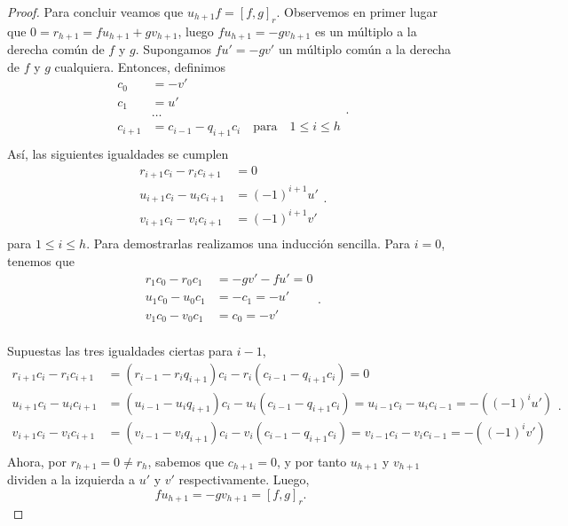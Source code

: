 \begin{proof}
Para concluir veamos que \(u_{h+1}f = [f,g]_r\). Observemos en primer lugar que \(0 = r_{h+1} = fu_{h+1} + gv_{h+1}\), luego \(fu_{h+1} = -gv_{h+1}\) es un múltiplo a la derecha común de \(f\) y \(g\). Supongamos \(fu' = -gv'\) un múltiplo común a la derecha de \(f\) y \(g\) cualquiera. Entonces, definimos
\[
\begin{aligned}
    c_0 &= -v' \\
    c_1 &= u' \\
    &\ldots \\
    c_{i+1} &= c_{i-1} - q_{i+1}c_i\quad \text{para}\quad 1 \le i \le h  \\
\end{aligned}
.\]
Así, las siguientes igualdades se cumplen
\[
\begin{aligned}
    r_{i+1}c_{i} - r_{i}c_{i+1} &= 0 \\
    u_{i+1}c_{i} - u_{i}c_{i+1} &= (-1)^{i+1}u' \\
    v_{i+1}c_{i} - v_{i}c_{i+1} &= (-1)^{i+1}v' \\
\end{aligned}
.\]
para \(1 \le i \le h\). Para demostrarlas realizamos una inducción sencilla. Para \(i = 0\), tenemos que
\[
\begin{aligned}
    r_{1}c_{0} - r_{0}c_{1} &= -gv' - fu' =  0 \\
    u_{1}c_{0} - u_{0}c_{1} &= -c_{1} =  -u' \\
    v_{1}c_{0} - v_{0}c_{1} &= c_{0} = -v' \\
\end{aligned}
.\]

Supuestas las tres igualdades ciertas para \(i-1\),
 \[
\begin{aligned}
    r_{i+1}c_{i} - r_{i}c_{i+1} &= (r_{i-1} - r_{i}q_{i+1})c_i - r_i(c_{i-1} - q_{i+1}c_i) = 0 \\
    u_{i+1}c_{i} - u_{i}c_{i+1} &= (u_{i-1} - u_{i}q_{i+1})c_i - u_i(c_{i-1} - q_{i+1}c_i) = u_{i-1}c_i - u_ic_{i-1}= -((-1)^{i}u')  \\
    v_{i+1}c_{i} - v_{i}c_{i+1} &= (v_{i-1} - v_{i}q_{i+1})c_i - v_i(c_{i-1} - q_{i+1}c_i) = v_{i-1}c_i - v_ic_{i-1}= -((-1)^{i}v')  \\

\end{aligned}
.\]
Ahora, por \(r_{h+1} = 0 \neq r_{h}\), sabemos que \(c_{h+1} = 0\), y por tanto \(u_{h+1}\) y \(v_{h+1}\) dividen a la izquierda a \(u'\) y \(v'\) respectivamente. Luego,
\[
f u_{h+1} = -g v_{h+1} = {[f, g]_r}
.\]
\end{proof}

